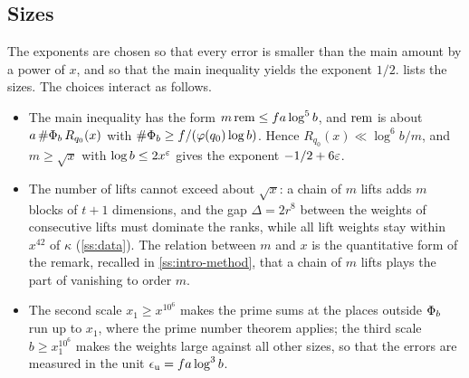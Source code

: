 \subsection{Sizes}\label{ss:overview-sizes}
The exponents are chosen so that every error is smaller than the main amount by a power of $x$, and
so that the main inequality yields the exponent $1/2$.  lists the sizes. The
choices interact as follows.
\begin{itemize}[leftmargin=1.5em]
\item The main inequality has the form $m\,\mathrm{rem}\le fa\log^5b$, and $\mathrm{rem}$ is about
$a\,\#\Phi_b\,R_{q_0}(x)$ with $\#\Phi_b\ge f/(\varphi(q_0)\log b)$. Hence $R_{q_0}(x)\ll
\log^6b/m$, and $m\ge\sqrt x$ with $\log b\le2x^\varepsilon$ gives the exponent $-1/2+6\varepsilon$.
\item The number of lifts cannot exceed about $\sqrt x$: a chain of $m$ lifts adds $m$ blocks of
$t+1$ dimensions, and the gap $\Delta=2r^8$ between the weights of consecutive lifts must dominate
the ranks, while all lift weights stay within $x^{42}$ of $\kappa$ (\cref{ss:data}). The relation
between $m$ and $x$ is the quantitative form of the remark, recalled in \cref{ss:intro-method}, that a
chain of $m$ lifts plays the part of vanishing to order $m$.
\item The second scale $x_1\ge x^{10^6}$ makes the prime sums at the places outside $\Phi_b$ run up to
$x_1$, where the prime number theorem applies; the third scale $b\ge x_1^{10^6}$ makes the weights
large against all other sizes, so that the errors are measured in the unit $\epsilon_{\mathrm{u}}=fa\log^3b$.
\end{itemize}

